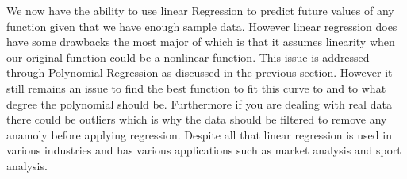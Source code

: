 We now have the ability to use linear Regression to predict future values of any function given that we have enough sample data.
However linear regression does have some drawbacks the most major of which is that it assumes linearity when our original function could be a nonlinear function. This issue is addressed through Polynomial Regression as discussed in the previous section. However it still remains an issue to find the best function to fit this curve to and to what degree the polynomial should be.
Furthermore if you are dealing with real data there could be outliers which is why the data should be filtered to remove any anamoly before applying regression.
Despite all that linear regression is used in various industries and has various applications such as market analysis and sport analysis.